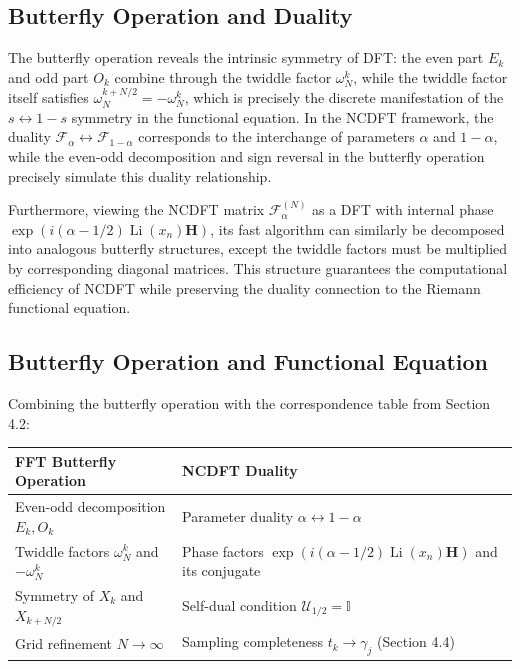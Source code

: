 \documentclass[12pt,a4paper]{amsart}
\theoremstyle{plain}
\theoremstyle{definition}
\theoremstyle{remark}
\begin{document}
\subsection{Butterfly Operation and Duality}

The butterfly operation reveals the intrinsic symmetry of DFT: the even part $E_k$ and odd part $O_k$ combine through the twiddle factor $\omega_N^k$, while the twiddle factor itself satisfies $\omega_N^{k+N/2} = -\omega_N^k$, which is precisely the discrete manifestation of the $s \leftrightarrow 1-s$ symmetry in the functional equation. In the NCDFT framework, the duality $\mathcal{F}_\alpha \leftrightarrow \mathcal{F}_{1-\alpha}$ corresponds to the interchange of parameters $\alpha$ and $1-\alpha$, while the even-odd decomposition and sign reversal in the butterfly operation precisely simulate this duality relationship.

Furthermore, viewing the NCDFT matrix $\mathcal{F}_\alpha^{(N)}$ as a DFT with internal phase $\exp(i(\alpha-1/2)\operatorname{Li}(x_n)\mathbf{H})$, its fast algorithm can similarly be decomposed into analogous butterfly structures, except the twiddle factors must be multiplied by corresponding diagonal matrices. This structure guarantees the computational efficiency of NCDFT while preserving the duality connection to the Riemann functional equation.

\subsection{Butterfly Operation and Functional Equation}

Combining the butterfly operation with the correspondence table from Section 4.2:

\begin{center}
\begin{tabular}{|l|l|}
\hline
FFT Butterfly Operation & NCDFT Duality \\
\hline
Even-odd decomposition $E_k, O_k$ & Parameter duality $\alpha \leftrightarrow 1-\alpha$ \\
\hline
Twiddle factors $\omega_N^k$ and $-\omega_N^k$ & Phase factors $\exp(i(\alpha-1/2)\operatorname{Li}(x_n)\mathbf{H})$ and its conjugate \\
\hline
Symmetry of $X_k$ and $X_{k+N/2}$ & Self-dual condition $\mathcal{U}_{1/2}=\mathbb{I}$ \\
\hline
Grid refinement $N\to\infty$ & Sampling completeness $t_k \to \gamma_j$ (Section 4.4) \\
\hline
\end{tabular}
\end{center}
\end{document}
